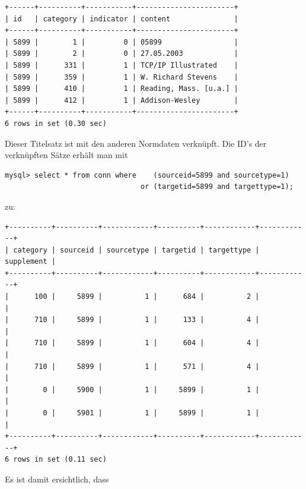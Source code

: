 \documentclass[11pt, twoside, a4paper, BCOR8mm, DIV12, bibtotoc,idxtotoc]{scrbook}
\begin{document}
\begin{shadowenv}
  \begin{center}
\begin{verbatim}
+------+----------+-----------+-----------------------+
| id   | category | indicator | content               |
+------+----------+-----------+-----------------------+
| 5899 |        1 |         0 | 05899                 |
| 5899 |        2 |         0 | 27.05.2003            |
| 5899 |      331 |         1 | TCP/IP Illustrated    |
| 5899 |      359 |         1 | W. Richard Stevens    |
| 5899 |      410 |         1 | Reading, Mass. [u.a.] |
| 5899 |      412 |         1 | Addison-Wesley        |
+------+----------+-----------+-----------------------+
6 rows in set (0.30 sec)
\end{verbatim}
  \end{center}
\end{shadowenv}

Dieser Titelsatz ist mit den anderen Normdaten verknüpft. Die ID's der
verknüpften Sätze erhält man mit

\begin{verbatim}
mysql> select * from conn where    (sourceid=5899 and sourcetype=1) 
                                or (targetid=5899 and targettype=1);
\end{verbatim}

zu:

\begin{shadowenv}
\begin{center}
\begin{verbatim}
+----------+----------+------------+----------+------------+------------+
| category | sourceid | sourcetype | targetid | targettype | supplement |
+----------+----------+------------+----------+------------+------------+
|      100 |     5899 |          1 |      684 |          2 |            |
|      710 |     5899 |          1 |      133 |          4 |            |
|      710 |     5899 |          1 |      604 |          4 |            |
|      710 |     5899 |          1 |      571 |          4 |            |
|        0 |     5900 |          1 |     5899 |          1 |            |
|        0 |     5901 |          1 |     5899 |          1 |            |
+----------+----------+------------+----------+------------+------------+
6 rows in set (0.11 sec)
\end{verbatim}
\end{center}
\end{shadowenv}

Es ist damit ersichtlich, dass 
\end{document}
